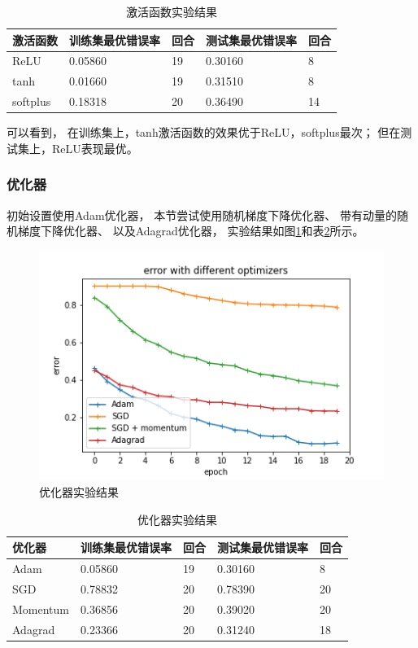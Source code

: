 \documentclass{article}
\begin{document}
\begin{table}[h]
\centering
\begin{tabular}{|l|l|l|l|l|} 
\hline
激活函数 & 训练集最优错误率 & 回合 & 测试集最优错误率 & 回合 \\
\hline
ReLU & 0.05860 & 19 & 0.30160 & 8 \\
tanh & 0.01660 & 19 & 0.31510 & 8 \\
softplus & 0.18318 & 20 & 0.36490 & 14 \\
\hline
\end{tabular}
\caption{激活函数实验结果}
\label{table:Activation}
\end{table}

可以看到，
在训练集上，tanh激活函数的效果优于ReLU，softplus最次；
但在测试集上，ReLU表现最优。

\subsubsection{优化器}

初始设置使用Adam优化器，
本节尝试使用随机梯度下降优化器、
带有动量的随机梯度下降优化器、
以及Adagrad优化器，
实验结果如图\ref{fig:Optimize}和表\ref{table:Optimize}所示。

\begin{figure}[p]
\includegraphics[width=\textwidth]
{Result/NN Adagrad/figure.png}
\caption{优化器实验结果}
\label{fig:Optimize}
\end{figure}

\begin{table}[h]
\centering
\begin{tabular}{|l|l|l|l|l|} 
\hline
优化器 & 训练集最优错误率 & 回合 & 测试集最优错误率 & 回合 \\
\hline
Adam & 0.05860 & 19 & 0.30160 & 8 \\
SGD & 0.78832 & 20 & 0.78390 & 20 \\
Momentum & 0.36856 & 20 & 0.39020 & 20 \\
Adagrad & 0.23366 & 20 & 0.31240 & 18 \\
\hline
\end{tabular}
\caption{优化器实验结果}
\label{table:Optimize}
\end{table}
\end{document}
